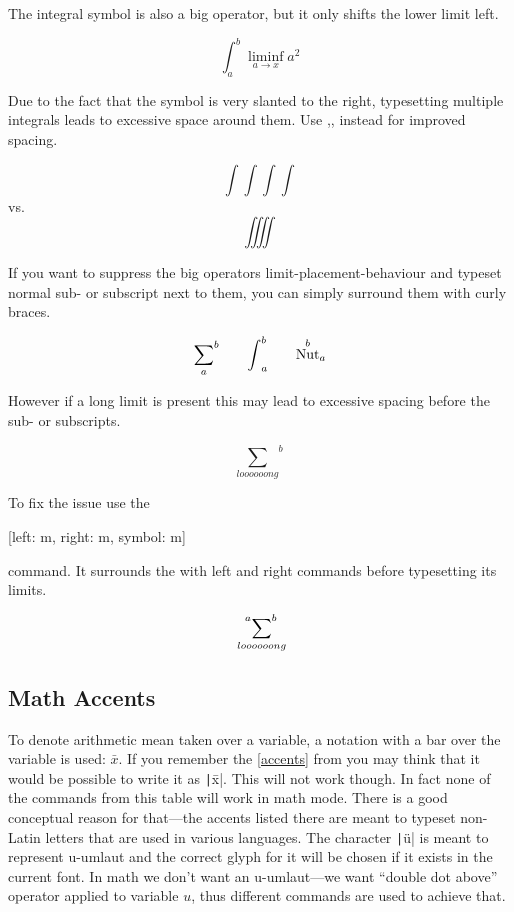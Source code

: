 The integral symbol is also a big operator, but it only shifts the lower limit
left.
\begin{example}
\[
  \int_a^b \liminf_{a \to x} a^2
\]
\end{example}
Due to the fact that the symbol is very slanted to the right, typesetting
multiple integrals leads to excessive space around them. Use
,, instead for improved spacing.
\begin{example}
\[ \int\int\int\int \]
vs.\ 
\[ \iiiint \]
\end{example}

If you want to suppress the big operators limit-placement-behaviour and typeset
normal sub- or subscript next to them, you can simply surround them with curly
braces.
\begin{example}
\[
  {\sum_{a}}^b
  \qquad%
  {\int}_a^b
  \qquad%
  {\nut^b}_a
\]
\end{example}
However if a long limit is present this may lead to excessive spacing
before the sub- or subscripts.
\begin{example}
\[ {\sum_{loooooong}}^{b} \]
\end{example}
To fix the issue use the
\begin{lscommand}
  [left: m, right: m, symbol: m]
\end{lscommand}
command. It surrounds the  with left and right commands before
typesetting its limits.
\begin{example}[vertical_mode, examplewidth=0.7\linewidth]
\[ \sideset{^{a}}{^{b}}{\sum}_{loooooong} \]
\end{example}

\subsection{Math Accents}\label{sec:math_accents}

To denote arithmetic mean taken over a variable, a notation with a bar over the
variable is used: \(\bar x\). If you remember the \autoref{accents} from
\autopageref{accents} you may think that it would be possible to write it as
\texttt|\=x|. This will not work though. In fact none of the
commands from this table will work in math mode. There is a good conceptual
reason for that---the accents listed there are meant to typeset non-Latin
letters that are used in various languages. The character
\texttt|\"u| is meant to represent u-umlaut and the correct glyph
for it will be chosen if it exists in the current font. In math we don't want
an u-umlaut---we want \enquote{double dot above} operator applied to variable
\(u\), thus different commands are used to achieve that.

